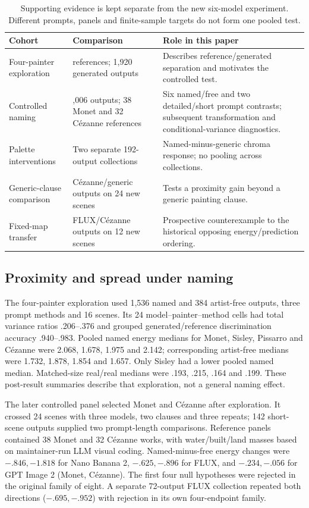 \documentclass[11pt]{article}
\begin{document}
\begin{table}[htbp]
\centering\small
\begin{tabularx}{\linewidth}{@{}>{\raggedright\arraybackslash}p{.22\linewidth}>{\raggedright\arraybackslash}p{.27\linewidth}>{\raggedright\arraybackslash}X@{}}
\toprule
Cohort & Comparison & Role in this paper\\
\midrule
Four-painter exploration & 649 references; 1,920 generated outputs &
Describes reference/generated separation and motivates the controlled test.\\[4pt]
Controlled naming & 1,006 outputs; 38 Monet and 32 C\'ezanne references &
Six named/free and two detailed/short prompt contrasts; subsequent transformation
and conditional-variance diagnostics.\\[4pt]
Palette interventions & Two separate 192-output collections &
Named-minus-generic chroma response; no pooling across collections.\\[4pt]
Generic-clause comparison & 96 C\'ezanne/generic outputs on 24 new scenes &
Tests a proximity gain beyond a generic painting clause.\\[4pt]
Fixed-map transfer & 240 FLUX/C\'ezanne outputs on 12 new scenes &
Prospective counterexample to the historical opposing energy/prediction ordering.\\
\bottomrule
\end{tabularx}
\caption{Supporting evidence is kept separate from the new six-model experiment.
Different prompts, panels and finite-sample targets do not form one pooled test.}
\label{tab:cohorts}
\end{table}

\subsection{Proximity and spread under naming}
The four-painter exploration used 1,536 named and 384 artist-free outputs,
three prompt methods and 16 scenes. Its 24 model--painter--method cells had
total variance ratios .206--.376 and grouped generated/reference discrimination accuracy
.940--.983. Pooled named energy medians for Monet, Sisley, Pissarro and C\'ezanne
were 2.068, 1.678, 1.975 and 2.142; corresponding artist-free medians were
1.732, 1.878, 1.854 and 1.657. Only Sisley had a lower pooled named median.
Matched-size real/real medians were .193, .215, .164 and .199. These post-result
summaries describe that exploration, not a general naming effect.

The later controlled panel selected Monet and C\'ezanne after exploration.
It crossed 24 scenes with three models, two clauses and three repeats; 142
short-scene outputs supplied two prompt-length comparisons. Reference panels
contained 38 Monet and 32 C\'ezanne works, with water/built/land masses based on
maintainer-run LLM visual coding. Named-minus-free energy changes were
$-.846,-1.818$ for Nano Banana 2, $-.625,-.896$ for FLUX, and $-.234,-.056$ for
GPT Image 2 (Monet, C\'ezanne). The first four null hypotheses were rejected in
the original family of eight. A separate 72-output FLUX collection repeated both directions
($-.695,-.952$) with rejection in its own four-endpoint family.
\end{document}
